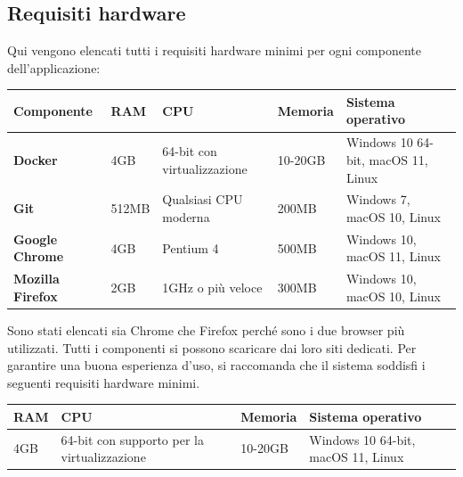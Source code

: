 \documentclass[a4paper,12pt]{article}
\begin{document}
    \subsection{Requisiti hardware}
        Qui vengono elencati tutti i requisiti hardware minimi per ogni componente dell'applicazione:
        \begin{center}
            \begin{tabularx}{\textwidth}{|l|l|l|l|X|}
                \hline
                \rowcolor{gold} 
                \textbf{Componente}  & \textbf{RAM}  & \textbf{CPU}     & \textbf{Memoria}    
                & \textbf{Sistema \newline operativo}   \\
                \hline
                \textbf{Docker} & {4GB} &  {64-bit con virtualizzazione} & 10-20GB & {Windows 10 64-bit, macOS 11, Linux} \\
                \hline
                \textbf{Git} & {512MB} & {Qualsiasi CPU moderna} & {200MB} & {Windows 7, macOS 10, Linux} \\
                \hline
                \textbf{Google Chrome} & {4GB} & {Pentium 4} & {500MB} & {Windows 10, \newline macOS 11, Linux} \\
                \hline
                \textbf{Mozilla Firefox} & {2GB} & {1GHz o più veloce} & {300MB} & {Windows 10, \newline macOS 10, Linux}\\
                \hline
                 \end{tabularx}
                 \end{center}
                 Sono stati elencati sia Chrome che Firefox perché sono i due browser più utilizzati. 
                 Tutti i componenti si possono scaricare dai loro siti dedicati. \newline
                 Per garantire una buona esperienza d'uso, si raccomanda che il sistema soddisfi i seguenti requisiti  hardware minimi.
        \begin{center}
            \begin{tabularx}{\textwidth}{|l|l|l|X|}
                \hline
                \rowcolor{gold} 
                \textbf{RAM}  & \textbf{CPU}  & \textbf{Memoria}  & \textbf{Sistema operativo}   \\
                \hline
                {4GB} & {64-bit con supporto per la virtualizzazione} & {10-20GB} & {Windows 10 64-bit,  \newline macOS 11, Linux} \\
                \hline
        \end{tabularx}
        \end{center}
                 
\end{document}
